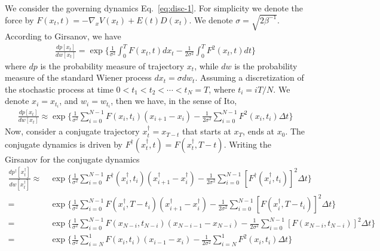 \documentclass[aps, pre, preprint,unsortedaddress,a4paper,onecolumn]{revtex4}
\newcommand{\dt}[0]{\Delta t}
\begin{document}
We consider the governing dynamics Eq.~\eqref{eq:disc-1}.
For simplicity we denote the force by $F(x_t,t) = -\nabla_x V(x_t)+ E(t)D(x_t) $.  We denote $\sigma =  \sqrt{2\beta^{-1}} $.
According to Girsanov, we have
\begin{align}
  \label{eq:tmp8}
  \frac{dp[x_t]}{dw[x_t]}  =
  \exp \bigg\{
  \frac 1{\sigma^2}\int_0^T F(x_t,t) dx_t -
  \frac1{2\sigma^2}\int_0^T F^2(x_t,t) dt
  \bigg\}
\end{align}
where $dp$ is the probability measure of trajectory $x_t$, while $dw$ is the
probability measure of the standard Wiener process $dx_t = \sigma dw_t$.
Assuming a discretization of the
stochastic process at time $0 < t_1 < t_2 < \cdots < t_N = T$, where
$t_i = iT / N$. We denote $x_i = x_{t_i}$, and $w_i = w_{t_i}$, then we have,
in the sense of Ito,
\begin{align}\label{eq:tmp9}
  \frac{dp[x_t]}{dw[x_t]}  \approx
  \exp\bigg\{\frac1{\sigma^2}\sum_{i=0}^{N-1} F(x_{i},t_{i})(x_{i+1} - x_i) -\frac1{2\sigma^2}\sum_{i=0}^{N-1}F^2(x_i,t_i)\dt\bigg\} 
\end{align}
Now, consider a conjugate trajectory $x^\dagger_t = x_{T-t}$ that starts at $x_T$, ends at $x_0$. The conjugate dynamics is driven by  $F^\dagger(x^\dagger_t,t) = F(x^\dagger_t, T-t)$.
Writing the Girsanov for the conjugate dynamics
\begin{align}\label{eq:dagger-0}
  \frac{dp^\dagger[x^\dagger_t]}{dw[x^\dagger_t]}  
  \approx\,&
  \exp\bigg\{
  \frac1{\sigma^2}\sum_{i=0}^{N-1} F^\dagger(x^\dagger_{i},t_{i})(x^\dagger_{i+1} - x^\dagger_i) -
  \frac1{2\sigma^2}\sum_{i=0}^{N-1}[F^\dagger(x^\dagger_i,t_i)]^2\dt\bigg\} \\ \nonumber
  =\,&
  \exp\bigg\{
  \frac1{\sigma^2}\sum_{i=0}^{N-1} F(x^\dagger_{i},T - t_{i})(x^\dagger_{i+1} - x^\dagger_i) -
  \frac1{2\sigma^2}\sum_{i=0}^{N-1}[F(x^\dagger_i, T-t_i)]^2\dt\bigg\} \\\nonumber
  =\,&
  \exp\bigg\{
  \frac1{\sigma^2}\sum_{i=0}^{N-1} F(x_{N-i},t_{N-i})(x_{N-i-1} - x_{N-i}) -
  \frac1{2\sigma^2}\sum_{i=0}^{N-1}[F(x_{N-i},t_{N-i})]^2\dt\bigg\} \\
  = \,&
  \exp\bigg\{
  \frac1{\sigma^2}\sum_{i=N}^{1} F(x_{i},t_{i})(x_{i-1} - x_i) -
  \frac1{2\sigma^2}\sum_{i=N}^{1}F^2(x_i,t_i)\dt\bigg\}
\end{align}
\end{document}
